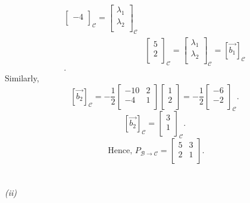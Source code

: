\documentclass{report}
\begin{document}
{\begin{align*}
\begin{bmatrix}
     -4\\
     \end{bmatrix}
     _{ \mathcal{C}} = \begin{bmatrix}
     \lambda_1\\
     \lambda_2\\
     \end{bmatrix}
     _{ \mathcal{C}}\\
     &  \begin{bmatrix}
     5\\
     2\\
     \end{bmatrix}
     _{ \mathcal{C}} = \begin{bmatrix}
     \lambda_1\\
     \lambda_2\\
     \end{bmatrix} _{ \mathcal{C}}  = \left[ \vec{ b_1}  \right] _{ \mathcal{C}}\\
     .\end{align*}
    Similarly, 
    \[
     \left[ \vec{ b_2}  \right] _{ \mathcal{C}} = - \frac{ 1  }{ 2 } \begin{bmatrix}
     -10 & 2\\
     -4 & 1\\
     \end{bmatrix} \begin{bmatrix}
     1\\
     2\\
     \end{bmatrix}
     = - \frac{ 1  }{ 2 }  \begin{bmatrix}
     -6\\
     -2\\
     \end{bmatrix}
      _{ \mathcal{C}}
    .\] 
    \[
     \left[ \vec{ b_2}  \right] _{ \mathcal{C}} = \begin{bmatrix}
     3\\
     1\\
     \end{bmatrix}        _{ \mathcal{C}}
    .\] 
    \[
    \text{ Hence, } P _{ \mathcal{B} \to \mathcal{C}} =  \begin{bmatrix}
    5 & 3\\
    2 & 1\\
    \end{bmatrix}
    .\] 
    \\
    \\
    \textit{(ii)}\\
}
\end{document}
